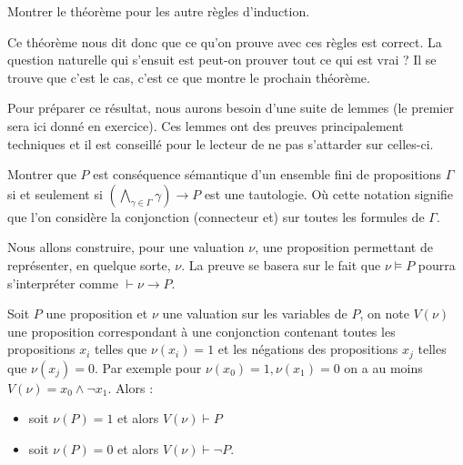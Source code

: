 \begin{exo}
    Montrer le théorème pour les autre règles d'induction.
\end{exo}

Ce théorème nous dit donc que ce qu'on prouve avec ces règles est correct. La question naturelle qui s'ensuit est \og peut-on prouver tout ce qui est vrai ?\fg{} Il se trouve que c'est le cas, c'est ce que montre le prochain théorème.

Pour préparer ce résultat, nous aurons besoin d'une suite de lemmes (le premier sera ici donné en exercice). Ces lemmes ont des preuves principalement techniques et il est conseillé pour le lecteur de ne pas s'attarder sur celles-ci.

\begin{exo}
    Montrer que $P$ est conséquence sémantique d'un ensemble fini de propositions $\Gamma$ si et seulement si $\left(\displaystyle{\bigwedge_{\gamma\in\Gamma}}\gamma \right)\to P$ est une tautologie. Où cette notation signifie que l'on considère la conjonction (connecteur \og et\fg{}) sur toutes les formules de $\Gamma$.
\end{exo}

Nous allons construire, pour une valuation $\nu$, une proposition permettant de représenter, en quelque sorte, $\nu$. La preuve se basera sur le fait que $\nu\models P$ pourra s'interpréter comme $\vdash \nu\to P$.

\begin{lem}
    Soit $P$ une proposition et $\nu$ une valuation sur les variables de $P$, on note $V(\nu)$ une proposition correspondant à une conjonction contenant toutes les propositions $x_i$ telles que $\nu(x_i)=1$ et les négations des propositions $x_j$ telles que $\nu(x_j) = 0$. Par exemple pour $\nu(x_0)=1,\nu(x_1)=0$ on a au moins $V(\nu) = x_0\land \lnot x_1$. Alors :
    \begin{itemize}[label=$\bullet$]
        \item soit $\nu(P) = 1$ et alors $V(\nu) \vdash P$
        \item soit $\nu(P) = 0$ et alors $V(\nu) \vdash \lnot P$.
    \end{itemize}
\end{lem}

